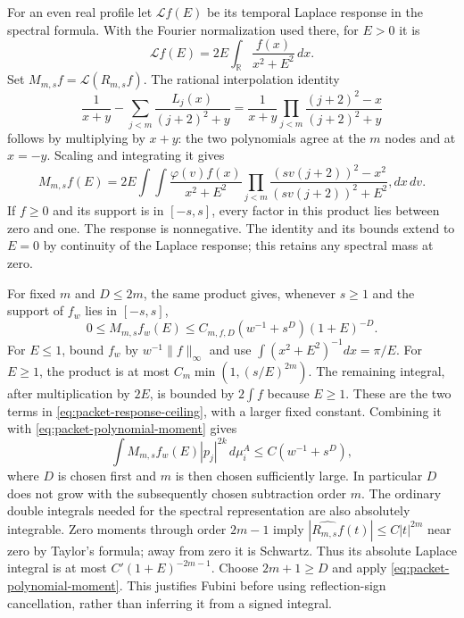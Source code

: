 For an even real profile let $\mathcal Lf(E)$ be its temporal Laplace
response in the spectral formula. With the Fourier normalization used
there, for $E>0$ it is
\[
 \mathcal L f(E)=2E\int_{\mathbb R}\frac{f(x)}{x^2+E^2}\,dx.
\]
Set $M_{m,s}f=\mathcal L(R_{m,s}f)$. The rational interpolation identity
\[
 \frac1{x+y}-\sum_{j<m}\frac{L_j(x)}{(j+2)^2+y}
 =\frac1{x+y}\prod_{j<m}\frac{(j+2)^2-x}{(j+2)^2+y}
\]
follows by multiplying by $x+y$: the two polynomials agree at the $m$
nodes and at $x=-y$. Scaling and integrating it gives
\begin{equation}\label{eq:packet-positive-kernel}
 M_{m,s}f(E)=2E\int\!\!\int
 \frac{\varphi(v)f(x)}{x^2+E^2}
 \prod_{j<m}\frac{(sv(j+2))^2-x^2}{(sv(j+2))^2+E^2},dx\,dv.
\end{equation}
If $f\geq0$ and its support is in $[-s,s]$, every factor in this product
lies between zero and one. The response is nonnegative. The identity and
its bounds extend to $E=0$ by continuity of the Laplace response; this
retains any spectral mass at zero.

For fixed $m$ and $D\leq2m$, the same product gives, whenever $s\geq1$
and the support of $f_w$ lies in $[-s,s]$,
\begin{equation}\label{eq:packet-response-ceiling}
 0\leq M_{m,s}f_w(E)
 \leq C_{m,f,D}(w^{-1}+s^D)(1+E)^{-D}.
\end{equation}
For $E\leq1$, bound $f_w$ by $w^{-1}\|f\|_\infty$ and use
$\int(x^2+E^2)^{-1}dx=\pi/E$. For $E\geq1$, the product is at most
$C_m\min(1,(s/E)^{2m})$. The remaining integral, after multiplication
by $2E$, is bounded by $2\int f$ because $E\geq1$. These are the two
terms in \eqref{eq:packet-response-ceiling}, with a larger fixed constant.
Combining it with \eqref{eq:packet-polynomial-moment} gives
\begin{equation}\label{eq:packet-response-moment}
 \int M_{m,s}f_w(E)|p_j|^{2k}\,d\mu_i^A
 \leq C(w^{-1}+s^D),
\end{equation}
where $D$ is chosen first and $m$ is then chosen sufficiently large.
In particular $D$ does not grow with the subsequently chosen subtraction
order $m$.
The ordinary double integrals needed for the spectral representation are
also absolutely integrable. Zero moments through order $2m-1$ imply
$|\widehat{R_{m,s}f}(t)|\leq C|t|^{2m}$ near zero by Taylor's formula;
away from zero it is Schwartz. Thus its absolute Laplace integral is
at most $C'(1+E)^{-2m-1}$. Choose $2m+1\geq D$ and apply
\eqref{eq:packet-polynomial-moment}. This justifies Fubini before using
reflection-sign cancellation, rather than inferring it from a signed integral.


